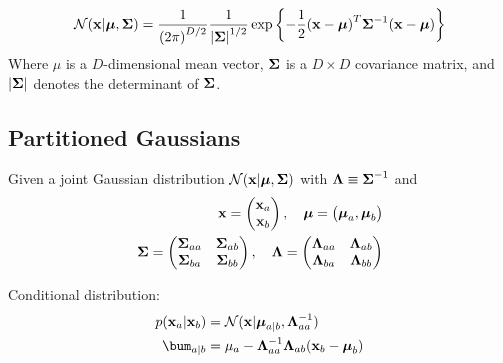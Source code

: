 \begin{equation}
    \mathcal{N}(\mathbf{x}|\boldsymbol\mu, \boldsymbol\Sigma) = \frac{1}{{(2\pi)}^{D/2}}
    \frac{1}{{|\boldsymbol\Sigma|}^{1/2}} \exp\left\{ -\frac{1}{2} {(\mathbf{x} -
    \boldsymbol\mu)}^T\boldsymbol\Sigma^{-1}(\mathbf{x} - \boldsymbol\mu) \right\} 
    \label{gaussian}
\end{equation}
Where $\mu$ is a $D$-dimensional mean vector, $\boldsymbol\Sigma$ is a $D \times D$
covariance matrix, and $|\boldsymbol\Sigma|$ denotes the determinant of $\boldsymbol\Sigma$.

\subsection{Partitioned Gaussians}
Given a joint Gaussian distribution $\mathcal{N}(\mathbf{x}|\boldsymbol\mu, \boldsymbol\Sigma)$ with
$\boldsymbol\Lambda \equiv \boldsymbol\Sigma^{-1}$ and 
\begin{align}
    \mathbf{x} = \begin{pmatrix}\mathbf{x}_a \\ \mathbf{x}_b \end{pmatrix}, \quad \boldsymbol\mu =
    \begin{pmatrix}\boldsymbol\mu_a, \boldsymbol\mu_b
    \end{pmatrix} \\
    \boldsymbol\Sigma = \begin{pmatrix}\boldsymbol\Sigma_{aa} & \boldsymbol\Sigma_{ab} \\ \boldsymbol\Sigma_{ba} &
        \boldsymbol\Sigma_{bb} \end{pmatrix} , \quad 
    \boldsymbol\Lambda = \begin{pmatrix} \boldsymbol\Lambda_{aa} & \boldsymbol\Lambda_{ab} \\ \boldsymbol\Lambda_{ba} &
        \boldsymbol\Lambda_{bb} \end{pmatrix}
\end{align}

Conditional distribution:
\begin{align}
    p(\bx_a|\bx_b) &= \mathcal{N}(\bx|\bmu_{a|b}, \bLam^{-1}_{aa}) \\
    \bum_{a|b} &= \mu_a - \bLam^{-1}_{aa}\bLam_{ab}(\bx_b -
    \bmu_{b})
\end{align}
